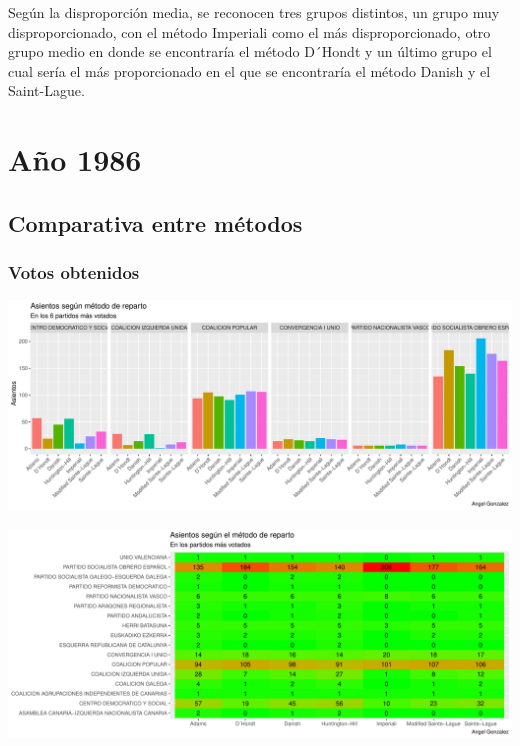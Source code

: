 \documentclass[12pt,a4paper,]{book}
\numberwithin{dummy}{section}
\theoremstyle{ocrenumbox}
\theoremstyle{blacknumex}
\theoremstyle{blacknumbox}
\theoremstyle{ocrenum}
\theoremstyle{ocrenum}
\begin{document}
Según la disproporción media, se reconocen tres grupos distintos, un
grupo muy disproporcionado, con el método Imperiali como el más
disproporcionado, otro grupo medio en donde se encontraría el método
D´Hondt y un último grupo el cual sería el más proporcionado en el que
se encontraría el método Danish y el Saint-Lague.

\hypertarget{auxf1o-1986}{%
\section{Año 1986}\label{auxf1o-1986}}

\hypertarget{comparativa-entre-muxe9todos-3}{%
\subsection{Comparativa entre
métodos}\label{comparativa-entre-muxe9todos-3}}

\hypertarget{votos-obtenidos-3}{%
\subsubsection{Votos obtenidos}\label{votos-obtenidos-3}}

\begin{center}\includegraphics[width=0.95\linewidth]{figurasR/unnamed-chunk-86-1} \end{center}

\begin{center}\includegraphics[width=0.95\linewidth]{figurasR/unnamed-chunk-86-2} \end{center}
\end{document}
